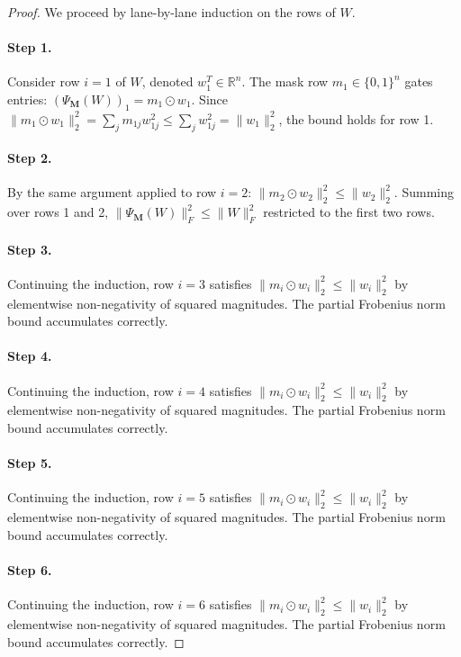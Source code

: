 \begin{proof}
We proceed by lane-by-lane induction on the rows of $W$.

\paragraph{Step 1.}
Consider row $i=1$ of $W$, denoted $w_1^T \in \mathbb{R}^n$.
The mask row $m_1 \in \{0,1\}^n$ gates entries: $(\Psi_{\mathbf{M}}(W))_1 = m_1 \odot w_1$.
Since $\|m_1 \odot w_1\|_2^2 = \sum_j m_{1j} w_{1j}^2 \leq \sum_j w_{1j}^2 = \|w_1\|_2^2$,
the bound holds for row 1. \cite{hanetal2015deep}

\paragraph{Step 2.}
By the same argument applied to row $i=2$:
$\|m_2 \odot w_2\|_2^2 \leq \|w_2\|_2^2$. Summing over rows 1 and 2,
$\|\Psi_{\mathbf{M}}(W)\|_F^2 \leq \|W\|_F^2$ restricted to the first two rows.

\paragraph{Step 3.}
Continuing the induction, row $i=3$
satisfies $\|m_i \odot w_i\|_2^2 \leq \|w_i\|_2^2$ by elementwise non-negativity
of squared magnitudes.  The partial Frobenius norm bound accumulates correctly.

\paragraph{Step 4.}
Continuing the induction, row $i=4$
satisfies $\|m_i \odot w_i\|_2^2 \leq \|w_i\|_2^2$ by elementwise non-negativity
of squared magnitudes.  The partial Frobenius norm bound accumulates correctly.

\paragraph{Step 5.}
Continuing the induction, row $i=5$
satisfies $\|m_i \odot w_i\|_2^2 \leq \|w_i\|_2^2$ by elementwise non-negativity
of squared magnitudes.  The partial Frobenius norm bound accumulates correctly.

\paragraph{Step 6.}
Continuing the induction, row $i=6$
satisfies $\|m_i \odot w_i\|_2^2 \leq \|w_i\|_2^2$ by elementwise non-negativity
of squared magnitudes.  The partial Frobenius norm bound accumulates correctly.


\end{proof}
